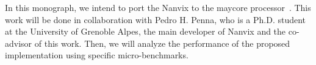 	In this monograph, we intend to port the Nanvix \hal to the \mppa maycore processor~\cite{DeDinechin2013-1}.
	This work will be done in collaboration with Pedro H. Penna, who is a Ph.D. student at the
	University of Grenoble Alpes, the main developer of Nanvix and the co-advisor of this work.
	Then, we will analyze the performance of the proposed implementation using specific micro-benchmarks.

%
%

